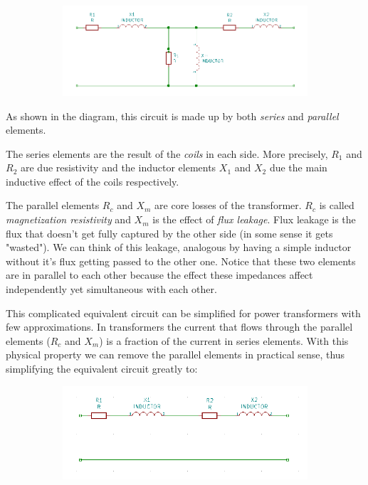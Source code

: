 \documentclass{article}
\begin{document}
	\begin{figure}[h!]
	\centering
	\begin{subfigure}[b]{1\linewidth}
		\includegraphics[width=\linewidth]{real_transformer.png}
	\end{subfigure}
	\end{figure}
	
	As shown in the diagram, this circuit is made up by both \textit{series} and \textit{parallel} elements.
	
	The series elements are the result of the \textit{coils} in each side. More precisely, $R_1$ and $R_2$ are due resistivity and the inductor elements $X_1$ and $X_2$ due the main inductive effect of the coils respectively.
	
	The parallel elements $R_c$ and $X_m$ are core losses of the transformer.
	$R_c$ is called \textit{magnetization resistivity} and $X_m$ is the effect of \textit{flux leakage}.
	Flux leakage is the flux that doesn't get fully captured by the other side (in some sense it gets "wasted").
	We can think of this leakage, analogous by having a simple inductor without it's flux getting passed to the other one. Notice that these two elements are in parallel to each other because the effect these impedances affect independently yet simultaneous with each other.
	
	This complicated equivalent circuit can be simplified for power transformers with few approximations.
	In transformers the current that flows through the parallel elements ($R_c$ and $X_m$) is a fraction of the current in series elements.
	With this physical property we can remove the parallel elements in practical sense, thus simplifying the equivalent circuit greatly to:
		
	\begin{figure}[h!]
	\centering
	\begin{subfigure}[b]{0.8\linewidth}
		\includegraphics[width=\linewidth]{transformer_approx1.png}
	\end{subfigure}
	\end{figure}
	
\end{document}

